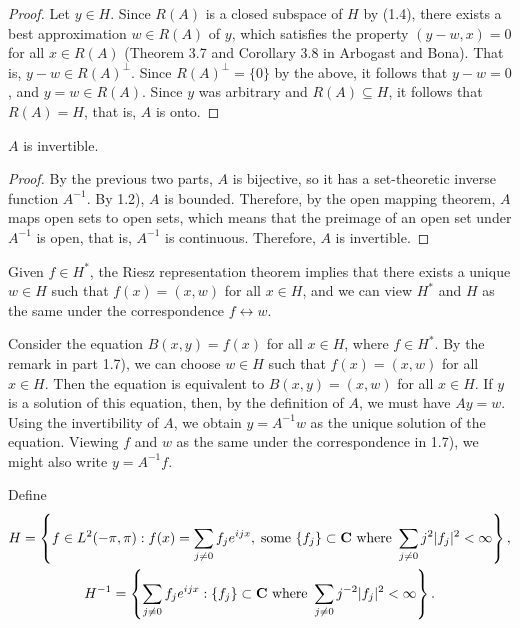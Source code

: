 \documentclass{homework}
\begin{document}
\begin{arabicparts}
\begin{proof}
			Let $y \in H$. Since $R(A)$ is a closed subspace of $H$ by (1.4), there exists a best approximation $w \in R(A)$ of $y$, which satisfies the property $(y - w, x) = 0$ for all $x \in R(A)$ (Theorem 3.7 and Corollary 3.8 in Arbogast and Bona). That is, $y-w \in R(A)^\perp$. Since $R(A)^\perp =\{0\}$ by the above, it follows that $y-w = 0$, and $y=w \in R(A)$. Since $y$ was arbitrary and $R(A) \subseteq H$, it follows that $R(A) = H$, that is, $A$  is onto.
		\end{proof}
		
		\questionpart
		$A$ is invertible.
		\begin{proof}
			By the previous two parts, $A$ is bijective, so it has a set-theoretic inverse function $A^{-1}$. By 1.2), $A$ is bounded. Therefore, by the open mapping theorem, $A$ maps open sets to open sets, which means that the preimage of an open set under $A^{-1}$ is open, that is, $A^{-1}$ is continuous. Therefore, $A$ is invertible.
		\end{proof}
		
		\questionpart
		Given $f \in H^{*}$, the Riesz representation theorem implies that there exists a unique $w \in H$ such that $f(x) = (x,w)$ for all $x \in H$, and we can view $H^{*}$ and $H$ as the same under the correspondence $f \leftrightarrow w$.
		
		\questionpart
		Consider the equation $B(x,y) = f(x)$ for all $x \in H$, where $f \in H^{*}$. By the remark in part 1.7), we can choose $w \in H$ such that $f(x) = (x,w)$ for all $x \in H$. Then the equation is equivalent to $B(x,y) = (x,w)$ for all $x \in H$. If $y$ is a solution of this equation, then, by the definition of $A$, we must have $Ay = w$. Using the invertibility of $A$, we obtain $y = A^{-1}w$ as the unique solution of the equation. Viewing $f$ and $w$ as the same under the correspondence in 1.7), we might also write $y = A^{-1}f$.
	\end{arabicparts}
	
	\question
	Define
	\begin{gather}
		\label{eq:h}
		H = \left\{f \in L^2(-\pi, \pi) : f(x) = \sum_{j\ne 0} f_j e^{ijx},\;\text{some }\{f_j\} \subset \textbf{C} \text{ where } \sum_{j\ne 0} j^2|f_j|^2 < \infty\right\}, \\
		\label{eq:hm1}
		H^{-1} = \left\{\sum_{j\ne 0} f_j e^{ijx} : \{f_j\} \subset \textbf{C} \text{ where } \sum_{j\ne 0} j^{-2}|f_j|^2 < \infty\right\}.
	\end{gather}
	
	\begin{arabicparts}
		\questionpart
	\end{arabicparts}
\end{document}
